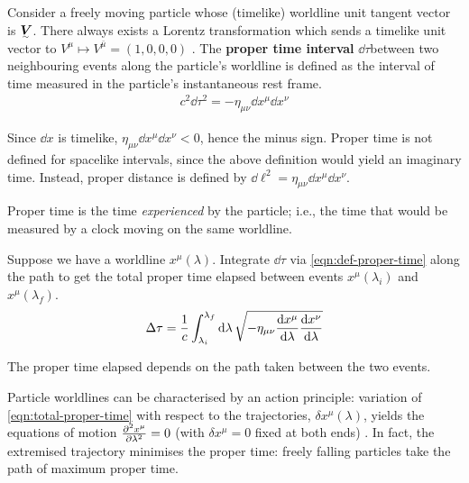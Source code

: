 Consider a freely moving particle whose (timelike) worldline unit tangent vector is $\ts V$.
There always exists a Lorentz transformation which sends a timelike unit vector to $V^\mu \mapsto V^{\bar\mu} = (1, 0, 0, 0)$ \exercise.
The \textbf{proper time interval} $\dd\tau$between two neighbouring events along the particle's worldline is defined as the interval of time measured in the particle's instantaneous rest frame.
\begin{align}
	c^2\dd\tau^2 = -\eta_{\mu\nu}\dd x^\mu\dd x^\nu
	\label{eqn:def-proper-time}
\end{align}

\begin{note}
	Since $\dd x$ is timelike, $\eta_{\mu\nu}\dd x^\mu\dd x^\nu < 0$, hence the minus sign.
	Proper time is not defined for spacelike intervals, since the above definition would yield an imaginary time.
	Instead, proper distance is defined by $\dd\ell^2 = \eta_{\mu\nu}\dd x^\mu\dd x^\nu$.
\end{note}
Proper time is the time \emph{experienced} by the particle; i.e., the time that would be measured by a clock moving on the same worldline.

Suppose we have a worldline $x^\mu(\lambda)$.
Integrate $\dd\tau$ via \eqref{eqn:def-proper-time} along the path to get the total proper time elapsed between events $x^\mu(\lambda_i)$ and $x^\mu(\lambda_f)$.
\begin{align}
	\Delta\tau = \frac1c \int_{\lambda_i}^{\lambda_f} \dd\lambda \, \sqrt{-\eta_{\mu\nu}\dv{x^\mu}{\lambda}\dv{x^\nu}{\lambda}}
	\label{eqn:total-proper-time}
\end{align}
\begin{note}
	The proper time elapsed depends on the path taken between the two events.
\end{note}

Particle worldlines can be characterised by an action principle: variation of \eqref{eqn:total-proper-time} with respect to the trajectories, $\delta x^\mu(\lambda)$, yields the equations of motion $\pdv[2]{x^\mu}{\lambda} = 0$ (with $\delta x^\mu = 0$ fixed at both ends) \exercise.
In fact, the extremised trajectory minimises the proper time: freely falling particles take the path of maximum proper time.